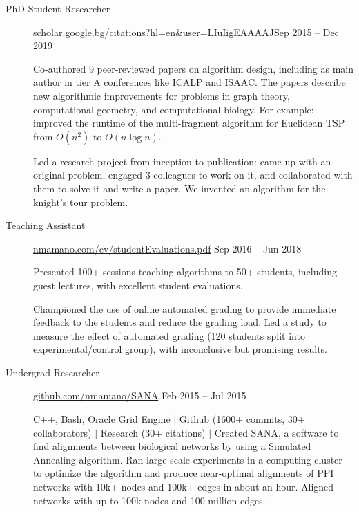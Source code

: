 \documentclass[letterpaper,10pt,oneside]{article}
\begin{document}
\begin{description}
\item[PhD Student Researcher]\quad \href{https://scholar.google.bg/citations?hl=en&user=LIuIigEAAAAJ}{scholar.google.bg/citations?hl=en\&user=LIuIigEAAAAJ}\hfill Sep 2015 -- Dec 2019

Co-authored 9 peer-reviewed papers on algorithm design, including as main author in tier A conferences like ICALP and ISAAC. The papers describe new algorithmic improvements for problems in graph theory, computational geometry, and computational biology. For example: improved the runtime of the multi-fragment algorithm for Euclidean TSP from $O(n^2)$ to $O(n\log n)$.

\vspace{2px}
\noindent Led a research project from inception to publication: came up with an original problem, engaged 3 colleagues to work on it, and collaborated with them to solve it and write a paper. We invented an algorithm for the knight's tour problem.

\item[Teaching Assistant]\quad \href{http://nmamano.com/cv/studentEvaluations.pdf}{nmamano.com/cv/studentEvaluations.pdf} \hfill Sep 2016 -- Jun 2018

Presented 100+ sessions teaching algorithms to 50+ students, including guest lectures, with excellent student evaluations.

\vspace{2px}
Championed the use of online automated grading to provide immediate feedback to the students and reduce the grading load. Led a study to measure the effect of automated grading (120 students split into experimental/control group), with inconclusive but promising results.

\item[Undergrad Researcher]\quad \href{https://github.com/nmamano/SANA}{github.com/nmamano/SANA} \hfill Feb 2015 -- Jul 2015

C++, Bash, Oracle Grid Engine $|$ Github (1600+ commits, 30+ collaborators) $|$ Research (30+ citations) $|$ Created SANA, a software to find alignments between biological networks by using a Simulated Annealing algorithm. Ran large-scale experiments in a computing cluster to optimize the algorithm and produce near-optimal alignments of PPI networks with 10k+ nodes and 100k+ edges in about an hour. Aligned networks with up to 100k nodes and 100 million edges.
\end{description}
\end{document}
